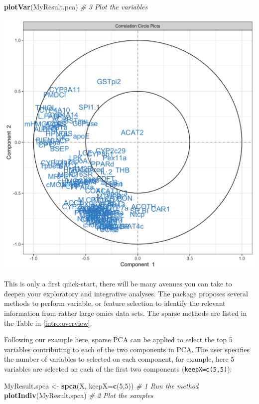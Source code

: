 \documentclass[]{book}
\newenvironment{Shaded}{\begin{snugshade}}{\end{snugshade}}
\newcommand{\CommentTok}[1]{\textcolor[rgb]{0.56,0.35,0.01}{\textit{#1}}}
\newcommand{\DataTypeTok}[1]{\textcolor[rgb]{0.13,0.29,0.53}{#1}}
\newcommand{\DecValTok}[1]{\textcolor[rgb]{0.00,0.00,0.81}{#1}}
\newcommand{\KeywordTok}[1]{\textcolor[rgb]{0.13,0.29,0.53}{\textbf{#1}}}
\newcommand{\NormalTok}[1]{#1}
\newcommand{\StringTok}[1]{\textcolor[rgb]{0.31,0.60,0.02}{#1}}
\begin{document}
\begin{Shaded}
\begin{Highlighting}[]
\KeywordTok{plotVar}\NormalTok{(MyResult.pca)   }\CommentTok{# 3 Plot the variables}
\end{Highlighting}
\end{Shaded}

\begin{center}\includegraphics[width=0.75\linewidth,]{Figures/02-pca-nutrimouse-2} \end{center}

This is only a first quick-start, there will be many avenues you can take to deepen your exploratory and integrative analyses. The package proposes several methods to perform variable, or feature selection to identify the relevant information from rather large omics data sets. The sparse methods are listed in the Table in \ref{intro:overview}.

Following our example here, sparse PCA can be applied to select the top 5 variables contributing to each of the two components in PCA. The user specifies the number of variables to selected on each component, for example, here 5 variables are selected on each of the first two components (\texttt{keepX=c(5,5)}):

\begin{Shaded}
\begin{Highlighting}[]
\NormalTok{MyResult.spca <-}\StringTok{ }\KeywordTok{spca}\NormalTok{(X, }\DataTypeTok{keepX=}\KeywordTok{c}\NormalTok{(}\DecValTok{5}\NormalTok{,}\DecValTok{5}\NormalTok{)) }\CommentTok{# 1 Run the method}
\KeywordTok{plotIndiv}\NormalTok{(MyResult.spca)               }\CommentTok{# 2 Plot the samples}
\end{Highlighting}
\end{Shaded}
\end{document}
